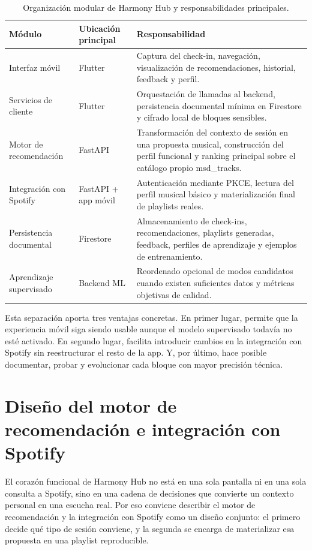 \begin{table}[htbp]
\centering
\small
\renewcommand{\arraystretch}{1.1}
\begin{tabularx}{\textwidth}{|P{2.8cm}|P{3.4cm}|Y|}
\hline
\textbf{Módulo} & \textbf{Ubicación principal} & \textbf{Responsabilidad} \\
\hline
Interfaz móvil & Flutter & Captura del check-in, navegación, visualización de recomendaciones, historial, feedback y perfil. \\
\hline
Servicios de cliente & Flutter & Orquestación de llamadas al backend, persistencia documental mínima en Firestore y cifrado local de bloques sensibles. \\
\hline
Motor de recomendación & FastAPI & Transformación del contexto de sesión en una propuesta musical, construcción del perfil funcional y ranking principal sobre el catálogo propio msd\_tracks. \\
\hline
Integración con Spotify & FastAPI + app móvil & Autenticación mediante PKCE, lectura del perfil musical básico y materialización final de playlists reales. \\
\hline
Persistencia documental & Firestore & Almacenamiento de check-ins, recomendaciones, playlists generadas, feedback, perfiles de aprendizaje y ejemplos de entrenamiento. \\
\hline
Aprendizaje supervisado & Backend ML & Reordenado opcional de modos candidatos cuando existen suficientes datos y métricas objetivas de calidad. \\
\hline
\end{tabularx}
\caption{Organización modular de Harmony Hub y responsabilidades principales.}
\label{tab:diseno_modular}
\end{table}

Esta separación aporta tres ventajas concretas. En primer lugar, permite que la
experiencia móvil siga siendo usable aunque el modelo supervisado todavía no
esté activado. En segundo lugar, facilita introducir cambios en la integración
con Spotify sin reestructurar el resto de la app. Y, por último, hace posible
documentar, probar y evolucionar cada bloque con mayor precisión técnica.

\section{Diseño del motor de recomendación e integración con Spotify}
\label{sec:diseno_motor_recomendacion}

El corazón funcional de Harmony Hub no está en una sola pantalla ni en una sola
consulta a Spotify, sino en una cadena de decisiones que convierte un contexto
personal en una escucha real. Por eso conviene describir el motor de
recomendación y la integración con Spotify como un diseño conjunto: el primero
decide qué tipo de sesión conviene, y la segunda se encarga de materializar esa
propuesta en una playlist reproducible.

